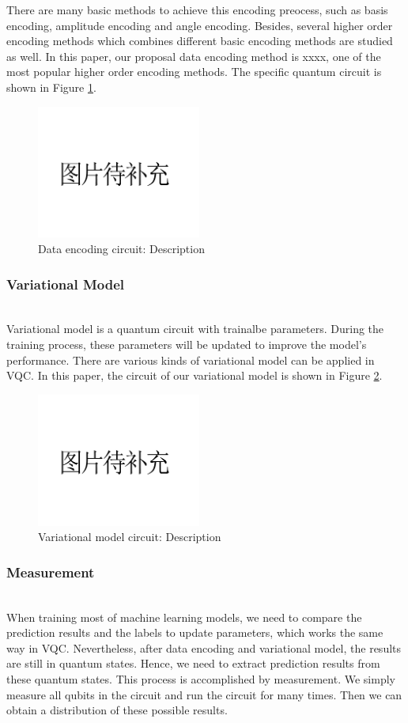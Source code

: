 \documentclass[sigconf]{acmart}
\begin{document}
There are many basic methods to achieve this encoding preocess, such as basis encoding, amplitude encoding and angle encoding. Besides, several higher order encoding methods which combines different basic encoding methods are studied as well. In this paper, our proposal data encoding method is xxxx, one of the most popular higher order encoding methods. The specific quantum circuit is shown in Figure \ref{fig:encoding}.
\begin{figure}[!ht]
	\centering
	\includegraphics[width=0.48\textwidth]{pre.png}
	\caption{Data encoding circuit: {\small \textnormal{ Description}} }
	\label{fig:encoding}
\end{figure}
\subsubsection{Variational Model}\hfill\\
Variational model is a quantum circuit with trainalbe parameters. During the training process, these parameters will be updated to improve the model's performance. There are various kinds of variational model can be applied in VQC. In this paper, the circuit of our variational model is shown in Figure \ref{fig:variational}.
\begin{figure}[!ht]
	\centering
	\includegraphics[width=0.48\textwidth]{pre.png}
	\caption{Variational model circuit: {\small \textnormal{ Description}} }
	\label{fig:variational}
\end{figure}
\subsubsection{Measurement}\hfill\\
 When training most of machine learning models, we need to compare the prediction results and the labels to update parameters, which works the same way in VQC. Nevertheless, after data encoding and variational model, the results are still in quantum states. Hence, we need to extract prediction results from these quantum states. This process is accomplished by measurement. We simply measure all qubits in the circuit and run the circuit for many times. Then we can obtain a distribution of these possible results.
 
\end{document}
